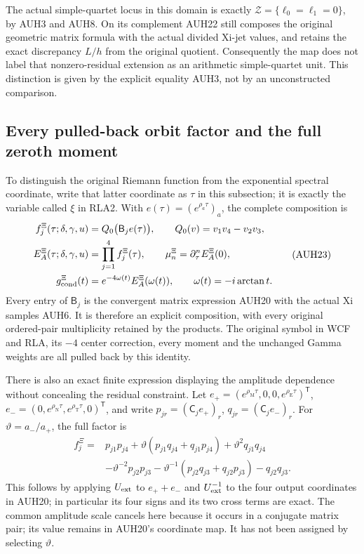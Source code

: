 The actual simple-quartet locus in this domain is exactly
$\mathcal Z=\{\ell_0=\ell_1=0\}$, by AUH3 and AUH8.
On its complement AUH22 still composes the original geometric
matrix formula with the actual divided Xi-jet values, and retains
the exact discrepancy $L/h$ from the original quotient.
Consequently the map does not label that nonzero-residual extension
as an arithmetic simple-quartet unit.  This distinction is given
by the explicit equality AUH3, not by an unconstructed comparison.

\subsection{Every pulled-back orbit factor and the full zeroth moment}

To distinguish the original Riemann function from the exponential
spectral coordinate, write that latter coordinate as $\tau$ in this
subsection; it is exactly the variable called $\xi$ in RLA2.
With $e(\tau)=(e^{\rho_a\tau})_a$, the complete composition is
\[
\begin{aligned}
 f_j^{\Xi}(\tau;\delta,\gamma,u)
 &=Q_0\bigl(\mathsf B_j e(\tau)\bigr),\qquad Q_0(v)=v_1v_4-v_2v_3,\\
 E_A^{\Xi}(\tau;\delta,\gamma,u)&=\prod_{j=1}^4f_j^{\Xi}(\tau),\qquad
 \mu_n^{\Xi}=\partial_\tau^nE_A^{\Xi}(0),\\
 g_{\rm cond}^{\Xi}(t)&=e^{-4\omega(t)}E_A^{\Xi}(\omega(t)),
       \qquad\omega(t)=-i\arctan t.
\end{aligned}\tag{AUH23}
\]
Every entry of $\mathsf B_j$ is the convergent matrix expression
AUH20 with the actual Xi samples AUH6.  It is therefore an explicit
composition, with every original ordered-pair multiplicity retained
by the products.  The original symbol in WCF and RLA, its $-4$
center correction, every moment and the unchanged Gamma weights
are all pulled back by this identity.

There is also an exact finite expression displaying the amplitude
dependence without concealing the residual constraint.
Let $e_+=(e^{\rho_{\mathrm M}\tau},0,0,e^{\rho_{\mathrm E}\tau})^{\mathsf T}$,
$e_-=(0,e^{\rho_{\mathrm N}\tau},e^{\rho_{\mathrm T}\tau},0)^{\mathsf T}$,
and write $p_{jr}=(\mathsf C_je_+)_r$,
$q_{jr}=(\mathsf C_je_-)_r$.
For $\vartheta=a_-/a_+$, the full factor is
\[
\begin{aligned}
 f_j^{\Xi}
 ={}&p_{j1}p_{j4}
 +\vartheta(p_{j1}q_{j4}+q_{j1}p_{j4})
 +\vartheta^2q_{j1}q_{j4}\\
 &-\vartheta^{-2}p_{j2}p_{j3}
 -\vartheta^{-1}(p_{j2}q_{j3}+q_{j2}p_{j3})
 -q_{j2}q_{j3}.
\end{aligned}\tag{AUH24}
\]
This follows by applying $U_{\rm ext}$ to $e_++e_-$ and
$U_{\rm ext}^{-1}$ to the four output coordinates in AUH20;
in particular its four signs and its two cross terms are exact.
The common amplitude scale cancels here because it occurs in a
conjugate matrix pair; its value remains in AUH20's coordinate map.
It has not been assigned by selecting $\vartheta$.


